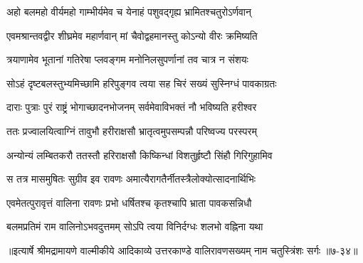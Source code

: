 \twolineshloka
{अहो बलमहो वीर्यमहो गाम्भीर्यमेव च}
{येनाहं पशुवद्गृह्य भ्रामितश्चतुरोऽर्णवान्} %

\twolineshloka
{एवमश्रान्तवद्वीर शीघ्रमेव महार्णवान्}
{मां चैवोद्वहमानस्तु कोऽन्यो वीरः क्रमिष्यति} %

\twolineshloka
{त्रयाणामेव भूतानां गतिरेषा प्लवङ्गम}
{मनोनिलसुपर्णानां तव चात्र न संशयः} %

\twolineshloka
{सोऽहं दृष्टबलस्तुभ्यमिच्छामि हरिपुङ्गव}
{त्वया सह चिरं सख्यं सुस्निग्धं पावकाग्रतः} %

\twolineshloka
{दाराः पुत्राः पुरं राष्ट्रं भोगाच्छादनभोजनम्}
{सर्वमेवाविभक्तं नौ भविष्यति हरीश्वर} %

\twolineshloka
{ततः प्रज्वालयित्वाग्निं तावुभौ हरीराक्षसौ}
{भ्रातृत्वमुपसम्पन्नौ परिष्वज्य परस्परम्} %

\twolineshloka
{अन्योन्यं लम्बितकरौ ततस्तौ हरिराक्षसौ}
{किष्किन्धां विशतुर्हृष्टौ सिंहौ गिरिगुहामिव} %

\twolineshloka
{स तत्र मासमुषितः सुग्रीव इव रावणः}
{अमात्यैरागतैर्नीतस्त्रैलोक्योत्सादनार्थिभिः} %

\twolineshloka
{एवमेतत्पुरावृत्तं वालिना रावणः प्रभो}
{धर्षितश्च कृतश्चापि भ्राता पावकसन्निधौ} %

\twolineshloka
{बलमप्रतिमं राम वालिनोऽभवदुत्तमम्}
{सोऽपि त्वया विनिर्दग्धः शलभो वह्निना यथा} %


॥इत्यार्षे श्रीमद्रामायणे वाल्मीकीये आदिकाव्ये उत्तरकाण्डे वालिरावणसख्यम् नाम चतुस्त्रिंशः सर्गः ॥७-३४॥
